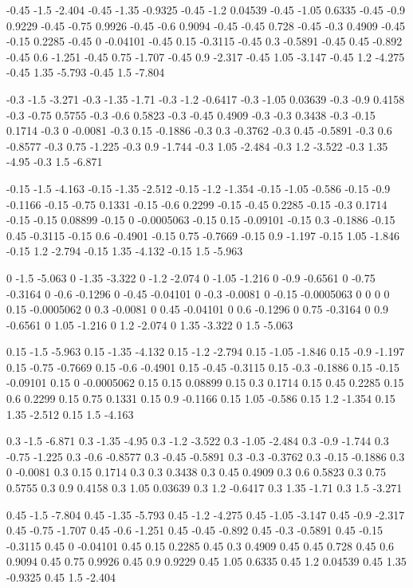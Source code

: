 -0.45 -1.5 -2.404
-0.45 -1.35 -0.9325
-0.45 -1.2 0.04539
-0.45 -1.05 0.6335
-0.45 -0.9 0.9229
-0.45 -0.75 0.9926
-0.45 -0.6 0.9094
-0.45 -0.45 0.728
-0.45 -0.3 0.4909
-0.45 -0.15 0.2285
-0.45 0 -0.04101
-0.45 0.15 -0.3115
-0.45 0.3 -0.5891
-0.45 0.45 -0.892
-0.45 0.6 -1.251
-0.45 0.75 -1.707
-0.45 0.9 -2.317
-0.45 1.05 -3.147
-0.45 1.2 -4.275
-0.45 1.35 -5.793
-0.45 1.5 -7.804

-0.3 -1.5 -3.271
-0.3 -1.35 -1.71
-0.3 -1.2 -0.6417
-0.3 -1.05 0.03639
-0.3 -0.9 0.4158
-0.3 -0.75 0.5755
-0.3 -0.6 0.5823
-0.3 -0.45 0.4909
-0.3 -0.3 0.3438
-0.3 -0.15 0.1714
-0.3 0 -0.0081
-0.3 0.15 -0.1886
-0.3 0.3 -0.3762
-0.3 0.45 -0.5891
-0.3 0.6 -0.8577
-0.3 0.75 -1.225
-0.3 0.9 -1.744
-0.3 1.05 -2.484
-0.3 1.2 -3.522
-0.3 1.35 -4.95
-0.3 1.5 -6.871

-0.15 -1.5 -4.163
-0.15 -1.35 -2.512
-0.15 -1.2 -1.354
-0.15 -1.05 -0.586
-0.15 -0.9 -0.1166
-0.15 -0.75 0.1331
-0.15 -0.6 0.2299
-0.15 -0.45 0.2285
-0.15 -0.3 0.1714
-0.15 -0.15 0.08899
-0.15 0 -0.0005063
-0.15 0.15 -0.09101
-0.15 0.3 -0.1886
-0.15 0.45 -0.3115
-0.15 0.6 -0.4901
-0.15 0.75 -0.7669
-0.15 0.9 -1.197
-0.15 1.05 -1.846
-0.15 1.2 -2.794
-0.15 1.35 -4.132
-0.15 1.5 -5.963

0 -1.5 -5.063
0 -1.35 -3.322
0 -1.2 -2.074
0 -1.05 -1.216
0 -0.9 -0.6561
0 -0.75 -0.3164
0 -0.6 -0.1296
0 -0.45 -0.04101
0 -0.3 -0.0081
0 -0.15 -0.0005063
0 0 0
0 0.15 -0.0005062
0 0.3 -0.0081
0 0.45 -0.04101
0 0.6 -0.1296
0 0.75 -0.3164
0 0.9 -0.6561
0 1.05 -1.216
0 1.2 -2.074
0 1.35 -3.322
0 1.5 -5.063

0.15 -1.5 -5.963
0.15 -1.35 -4.132
0.15 -1.2 -2.794
0.15 -1.05 -1.846
0.15 -0.9 -1.197
0.15 -0.75 -0.7669
0.15 -0.6 -0.4901
0.15 -0.45 -0.3115
0.15 -0.3 -0.1886
0.15 -0.15 -0.09101
0.15 0 -0.0005062
0.15 0.15 0.08899
0.15 0.3 0.1714
0.15 0.45 0.2285
0.15 0.6 0.2299
0.15 0.75 0.1331
0.15 0.9 -0.1166
0.15 1.05 -0.586
0.15 1.2 -1.354
0.15 1.35 -2.512
0.15 1.5 -4.163

0.3 -1.5 -6.871
0.3 -1.35 -4.95
0.3 -1.2 -3.522
0.3 -1.05 -2.484
0.3 -0.9 -1.744
0.3 -0.75 -1.225
0.3 -0.6 -0.8577
0.3 -0.45 -0.5891
0.3 -0.3 -0.3762
0.3 -0.15 -0.1886
0.3 0 -0.0081
0.3 0.15 0.1714
0.3 0.3 0.3438
0.3 0.45 0.4909
0.3 0.6 0.5823
0.3 0.75 0.5755
0.3 0.9 0.4158
0.3 1.05 0.03639
0.3 1.2 -0.6417
0.3 1.35 -1.71
0.3 1.5 -3.271

0.45 -1.5 -7.804
0.45 -1.35 -5.793
0.45 -1.2 -4.275
0.45 -1.05 -3.147
0.45 -0.9 -2.317
0.45 -0.75 -1.707
0.45 -0.6 -1.251
0.45 -0.45 -0.892
0.45 -0.3 -0.5891
0.45 -0.15 -0.3115
0.45 0 -0.04101
0.45 0.15 0.2285
0.45 0.3 0.4909
0.45 0.45 0.728
0.45 0.6 0.9094
0.45 0.75 0.9926
0.45 0.9 0.9229
0.45 1.05 0.6335
0.45 1.2 0.04539
0.45 1.35 -0.9325
0.45 1.5 -2.404

